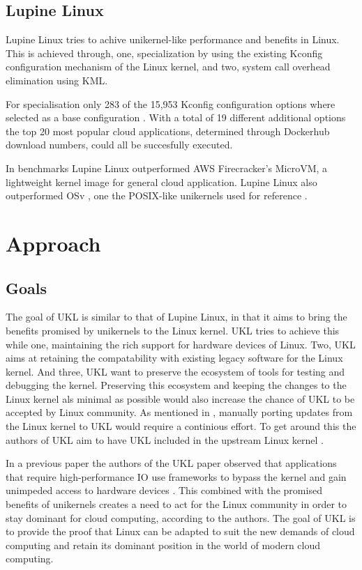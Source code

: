\documentclass[10pt,twocolumn,a4paper]{article}
\begin{document}
  \subsection{Lupine Linux}
    Lupine Linux tries to achive unikernel-like performance and benefits in Linux.
    This is achieved through, one, specialization by using the existing Kconfig 
    configuration mechanism of the Linux kernel, 
    and two, system call overhead elimination using KML.

    For specialisation only 283 of the 15,953 Kconfig configuration options where
    selected as a base configuration \cite{kuo20}.
    With a total of 19 different additional options the top 20 most popular cloud applications,
    determined through Dockerhub download numbers, could all be succesfully executed.

    In benchmarks Lupine Linux outperformed AWS Firecracker's MicroVM, a lightweight 
    kernel image for general cloud application. 
    Lupine Linux also outperformed OSv \cite{osv}, 
    one the POSIX-like unikernels used for reference \cite{kuo20}.

\section{Approach}\label{sec:approach}
  \subsection{Goals}\label{sec:goals}
    The goal of UKL is similar to that of Lupine Linux, in that it aims
    to bring the benefits promised by unikernels to the Linux kernel.
    UKL tries to achieve this while one, maintaining the rich support for hardware devices of Linux.
    Two, UKL aims at retaining the compatability with existing legacy software for the Linux kernel.
    And three, UKL want to preserve the ecosystem of tools for testing and debugging the kernel.
    Preserving this ecosystem and keeping the changes to the Linux kernel als minimal as possible
    would also increase the chance of UKL to be accepted by Linux community.
    As mentioned in , manually porting updates from
    the Linux kernel to UKL would require a continious effort.
    To get around this the authors of UKL aim to have UKL included in the upstream Linux kernel
    \cite{ukl-redhat-post}.

    In a previous paper \cite{raza19} the authors of the UKL paper \cite{raza23}
    observed that applications that require high-performance IO use frameworks
    to bypass the kernel and gain unimpeded access to hardware devices \cite{raza19}.
    This combined with the promised benefits of unikernels creates a need to act
    for the Linux community in order to stay dominant for cloud computing, according to the authors.
    The goal of UKL is to provide the proof that Linux can be adapted to suit the new demands of
    cloud computing and retain its dominant position in the world of modern cloud computing.
\end{document}
